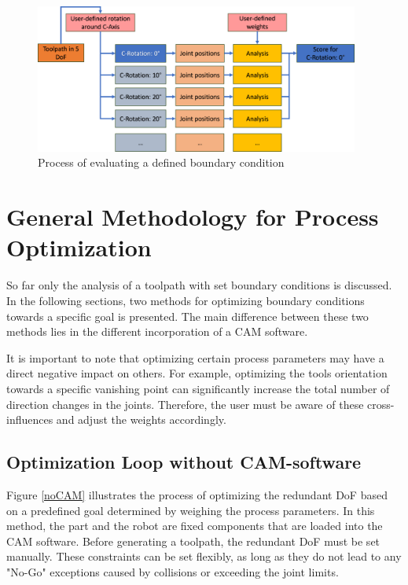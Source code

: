\begin{figure}[H]
	\centerline{\includegraphics[width=0.95\textwidth]{figures/grob.png}}
	\caption{Process of evaluating a defined boundary condition}
	\label{grob}
\end{figure}
















\newpage
\section{General Methodology for Process Optimization}
So far only the analysis of a toolpath with set boundary conditions is discussed. In the following sections, two methods for optimizing boundary conditions towards a specific goal is presented. The main difference between these two methods lies in the different incorporation of a \acrshort{CAM} software.

It is important to note that optimizing certain process parameters may have a direct negative impact on others. For example, optimizing the tools orientation towards a specific vanishing point can significantly increase the total number of direction changes in the joints. Therefore, the user must be aware of these cross-influences and adjust the weights accordingly.

\subsection{Optimization Loop without CAM-software}\label{noCAMchap}

Figure \ref{noCAM} illustrates the process of optimizing the redundant \acrshort{DoF} based on a predefined goal determined by weighing the process parameters. In this method, the part and the robot are fixed components that are loaded into the \acrshort{CAM} software. Before generating a toolpath, the redundant \acrshort{DoF} must be set manually. These constraints can be set flexibly, as long as they do not lead to any "No-Go" exceptions caused by collisions or exceeding the joint limits.


